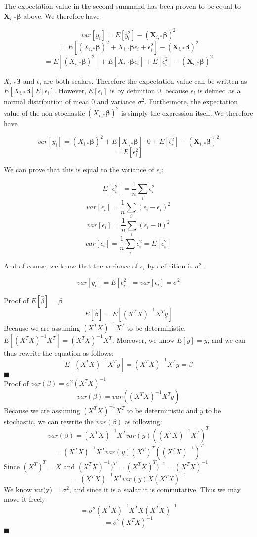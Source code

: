\documentclass{article}
\begin{document}
The expectation value in the second summand has been proven to be equal 
to $\bm{X}_{i,*}\bm{\beta}$ above. We therefore have

\[ var[y_i] = E[y_i^2] - (\bm{X}_{i,*}\bm{\beta})^2 \]
\[ = E\left[(X_{i,*}\bm{\beta})^2 + X_{i,*}\bm{\beta}\epsilon_i + \epsilon_i^2\right] - (\bm{X}_{i,*}\bm{\beta})^2 \]
\[ = E\left[(X_{i,*}\bm{\beta})^2\right] + E[X_{i,*}\bm{\beta}\epsilon_i] + E[\epsilon_i^2] - (\bm{X}_{i,*}\bm{\beta})^2 \]

$X_{i,*}\bm{\beta}$ and $\epsilon_i$ are both scalars. Therefore the expectation value can be written as
$E[X_{i,*}\bm{\beta}]E[\epsilon_i]$. However, $E[\epsilon_i]$ is by definition $0$, because $\epsilon_i$ is
defined as a normal distribution of mean $0$ and variance $\sigma^2$. Furthermore, the expectation value of the
non-stochastic $(X_{i,*}\bm{\beta})^2$ is simply the expression itself. We therefore have

\[ var[y_i] = (X_{i,*}\bm{\beta})^2 + E[X_{i,*}\bm{\beta}]\cdot 0 + E[\epsilon_i^2] - (\bm{X}_{i,*}\bm{\beta})^2 \]
\[ = E[\epsilon_i^2] \]

We can prove that this is equal to the variance of $\epsilon_i$:

\[ E[\epsilon_i^2] = \frac{1}{n} \sum_i \epsilon_i^2\]
\[ var[\epsilon_i] = \frac{1}{n} \sum_i (\epsilon_i - \bar{\epsilon_i})^2\]
\[ var[\epsilon_i] = \frac{1}{n} \sum_i (\epsilon_i - 0)^2\]
\[ var[\epsilon_i] = \frac{1}{n} \sum_i \epsilon_i^2 = E[\epsilon_i^2] \]

And of course, we know that the variance of $\epsilon_i$ by definition is $\sigma^2$.

\[ var[y_i] = E[\epsilon_i^2] = var[\epsilon_i] = \sigma^2 \]

Proof of $E[\hat{\beta}] = \beta$
$$E[\hat{\beta}] = E[(X^{T}X)^{-1}X^{T}y]$$
Because we are assuming $(X^{T}X)^{-1}X^{T}$ to be deterministic, $E[(X^{T}X)^{-1}X^{T}] = (X^{T}X)^{-1}X^{T}$. Moreover, we know $E[y] = y$, and we can thus rewrite the equation as follows:
$$E[(X^{T}X)^{-1}X^{T}y] = (X^{T}X)^{-1}X^{T}y = \beta$$
$\blacksquare$
\\

Proof of $var(\beta) = \sigma^{2}(X^{T}X)^{-1}$
$$var(\beta) = var((X^{T}X)^{-1}X^{T}y)$$
Because we are assuming $(X^{T}X)^{-1}X^{T}$ to be deterministic and $y$ to be stochastic, we can rewrite the $var(\beta)$ as following:
$$var(\beta) = (X^{T}X)^{-1}X^{T}var(y)((X^{T}X)^{-1}X^{T})^{T}$$
$$ = (X^{T}X)^{-1}X^{T}var(y)(X^{T})^{T}((X^{T}X)^{-1})^{T}$$
Since $(X^{T})^{T} = X$ and $(X^{T}X)^{-1})^{T}$ = $(X^{T}X)^{T})^{-1} = (X^{T}X)^{-1}$
$$ = (X^{T}X)^{-1}X^{T}var(y)X(X^{T}X)^{-1} $$
We know var(y) = $\sigma^{2}$, and since it is a scalar it is commutative. Thus we may move it freely
$$ = \sigma^{2}(X^{T}X)^{-1}X^{T}X(X^{T}X)^{-1} $$
$$ = \sigma^{2}(X^{T}X)^{-1} $$
$\blacksquare$
\end{document}
